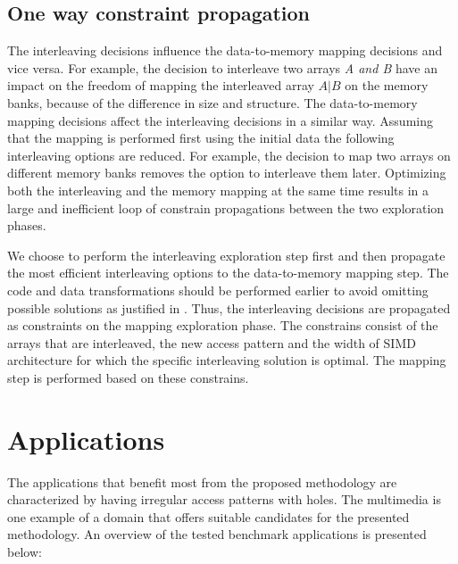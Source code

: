 \documentclass[prodmode,acmtecs]{acmsmall}
\begin{document}
\subsection{One way constraint propagation}

The interleaving decisions influence the data-to-memory mapping decisions and vice versa.
For example, the decision to interleave two arrays \textit{A and B} have an impact on the freedom of mapping the interleaved array $A\vert B$ on the memory banks, because of the difference in size and structure.
The data-to-memory mapping decisions affect the interleaving decisions in a similar way.
Assuming that the mapping is performed first using the initial data the following interleaving options are reduced.
For example, the decision to map two arrays on different memory banks removes the option to interleave them later.
Optimizing both the interleaving and the memory mapping at the same time results in a large and inefficient loop of constrain propagations between the two exploration phases.
 
We choose to perform the interleaving exploration step first and then propagate the most efficient interleaving options to the data-to-memory mapping step.
The code and data transformations should be performed earlier to avoid omitting possible solutions as justified in \cite{dtse}.
Thus, the interleaving decisions are propagated as constraints on the mapping exploration phase. 
The constrains consist of the arrays that are interleaved, the new access pattern and the width of SIMD architecture for which the specific interleaving solution is optimal.
The mapping step is performed based on these constrains.

\section{Applications}
\label{sec:applications}

The applications that benefit most from the proposed methodology are characterized by having irregular access patterns with holes.
The multimedia is one example of a domain that offers suitable candidates for the presented methodology.
An overview of the tested benchmark applications is presented below:
\end{document}
